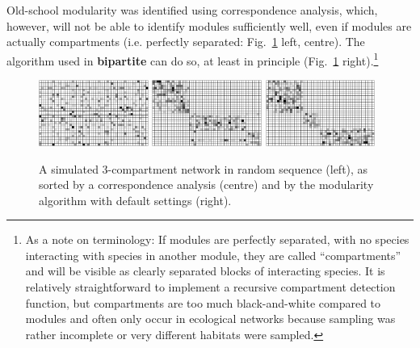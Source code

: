 \documentclass[a4paper, 11pt]{article}\usepackage[]{graphicx}\usepackage[]{color}
\newcommand{\package}[1]{\textbf{#1}}
\begin{document}
Old-school modularity was identified using correspondence analysis, which, however, will not be able to identify modules sufficiently well, even if modules are actually compartments (i.e. perfectly separated: Fig.~\ref{fig:randomCAsorted} left, centre). The algorithm used in \package{bipartite} can do so, at least in principle (Fig.~\ref{fig:randomCAsorted} right).\footnote{As a note on terminology: If modules are perfectly separated, with no species interacting with species in another module, they are called ``compartments'' and will be visible as clearly separated blocks of interacting species. It is relatively straightforward to implement a recursive compartment detection function, but compartments are too much black-and-white compared to modules and often only occur in ecological networks because sampling was rather incomplete or very different habitats were sampled.}
\begin{figure}
	\hfill
	\includegraphics[width=0.32\textwidth]{figures/random_small_high_nonoise_small} %
	\hfill
	\includegraphics[width=0.32\textwidth]{figures/CA_small_high_nonoise_small}%
	\hfill
	\includegraphics[width=0.32\textwidth]{figures/sorted_small_high_nonoise_small}%
	\hfill
	\caption{A simulated 3-compartment network in random sequence (left), as sorted by a correspondence analysis (centre) and by the modularity algorithm with default settings (right).}
\label{fig:randomCAsorted}
\end{figure}
\end{document}
